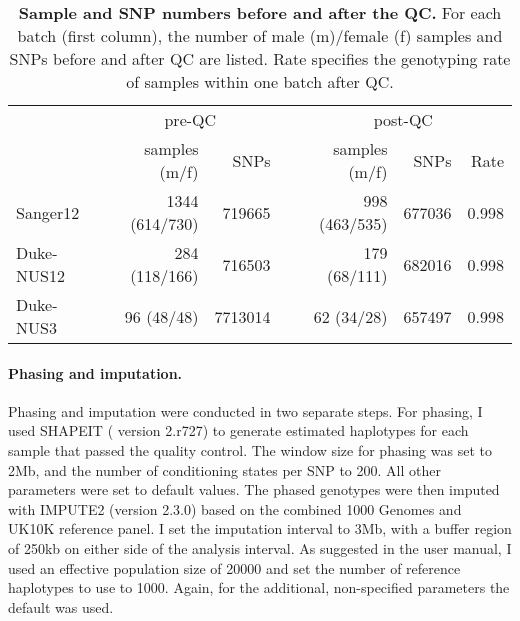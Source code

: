 \begin{table}[htbp]
  \centering
  \caption[\textbf{Sample and SNP numbers before and after the QC. }]{\textbf{Sample and SNP numbers before and after the QC. } For each batch (first column), the number of male (m)/female (f) samples and SNPs before and after QC are listed. Rate specifies the genotyping rate of samples within one batch after QC. }
    \begin{tabular}{lrrrrrr}
    \toprule
          & \multicolumn{2}{c}{pre-QC} &       & \multicolumn{3}{c}{post-QC} \\
\cmidrule{2-3}\cmidrule{5-7}          & samples (m/f) & SNPs  &       & samples (m/f) & SNPs  & Rate \\
\cmidrule{2-7}    Sanger12 & \num{1344}  (\num{614}/\num{730}) & \num{719665} &       & \num{998} (\num{463}/\num{535}) & \num{677036} & \num{0.998} \\
    Duke-NUS12 & \num{284} (\num{118}/\num{166}) & \num{716503} &       & \num{179} (\num{68}/\num{111}) & \num{682016} & \num{0.998} \\
    Duke-NUS3 & \num{96} (\num{48}/\num{48}) & \num{7713014} &       & \num{62} (\num{34}/\num{28}) & \num{657497} & \num{0.998} \\
    \bottomrule
    \end{tabular}%
    \label{tab:genoOverview}%
\end{table}%

\paragraph{Phasing and imputation.} Phasing and imputation were conducted in two separate steps. For phasing, I used SHAPEIT ( version 2.r727) \citep{Delaneau2012,Delaneau2013} to generate estimated haplotypes for each sample that passed the quality control. The window size for phasing was set to 2Mb, and the number of conditioning states per SNP to \num{200}. All other parameters were set to default values. The phased genotypes were then imputed with IMPUTE2  (version 2.3.0) \citep{Marchini2007, Howie2009} based on the combined \num{1000} Genomes \citep{1000Genomes2015} and UK10K \citep{UK10KConsortium2015} reference panel. I set the imputation interval to 3Mb,  with a buffer region of \num{250}kb on either side of the analysis interval. As suggested in the user manual, I used an effective population size of \num{20000} and set the number of reference haplotypes to use to \num{1000}. Again, for the additional, non-specified parameters the default was used.

